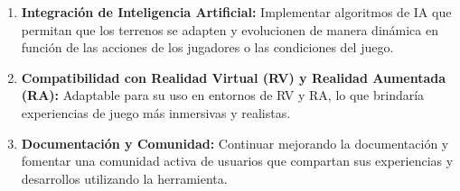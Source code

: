 \begin{enumerate}
    \item \textbf{Integración de Inteligencia Artificial:} Implementar algoritmos de IA que permitan que los terrenos se adapten y evolucionen de manera dinámica en función de las acciones de los jugadores o las condiciones del juego.
    
    \item \textbf{Compatibilidad con Realidad Virtual (RV) y Realidad Aumentada (RA):} Adaptable para su uso en entornos de RV y RA, lo que brindaría experiencias de juego más inmersivas y realistas.
    
    \item \textbf{Documentación y Comunidad:} Continuar mejorando la documentación y fomentar una comunidad activa de usuarios que compartan sus experiencias y desarrollos utilizando la herramienta.
\end{enumerate}


